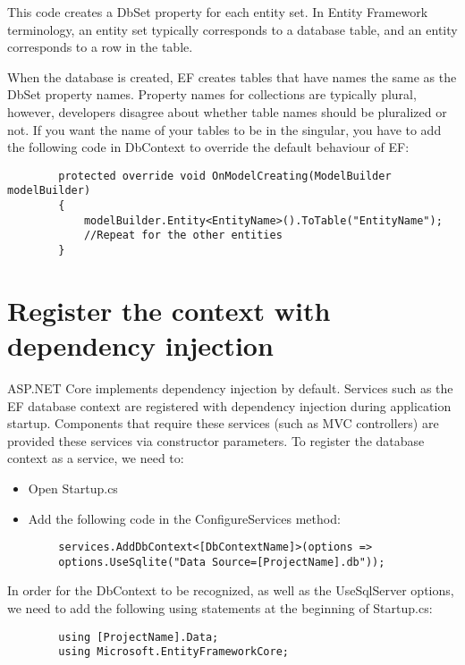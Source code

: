 \documentclass{report}
\begin{document}
    This code creates a DbSet property for each entity set. In Entity Framework terminology,
    an entity set typically corresponds to a database table, and an entity corresponds to a row in the table.

    When the database is created, EF creates tables that have names the same as the DbSet property names.
    Property names for collections are typically plural, however, developers disagree about whether table
    names should be pluralized or not. If you want the name of your tables to be in the singular, you have
    to add the following code in DbContext to override the default behaviour of EF:
    \lstset{style=sharpc}
    \begin{lstlisting}
        protected override void OnModelCreating(ModelBuilder modelBuilder)
        {
            modelBuilder.Entity<EntityName>().ToTable("EntityName");
            //Repeat for the other entities
        }
    \end{lstlisting}

    \section{Register the context with dependency injection}
    ASP.NET Core implements dependency injection by default. Services such as the
    EF database context are registered with dependency injection during application
    startup. Components that require these services (such as MVC controllers) are
    provided these services via constructor parameters. To register the database
    context as a service, we need to:
    \begin{itemize}
        \item Open Startup.cs
        \item Add the following code in the ConfigureServices method:
    \end{itemize}

    \lstset{style=sharpc}
    \begin{lstlisting}
        services.AddDbContext<[DbContextName]>(options =>
        options.UseSqlite("Data Source=[ProjectName].db"));
    \end{lstlisting}

    In order for the DbContext to be recognized, as well as the UseSqlServer options, we need to
    add the following using statements at the beginning of Startup.cs:
    \lstset{style=sharpc}
    \begin{lstlisting}
        using [ProjectName].Data;
        using Microsoft.EntityFrameworkCore;
    \end{lstlisting}
\end{document}
